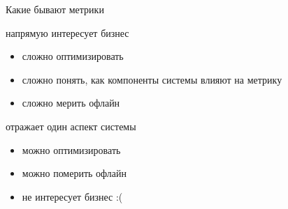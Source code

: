 \documentclass[11pt,aspectratio=169,handout]{beamer}
\begin{document}
\begin{frame}{Какие бывают метрики}

\begin{tcolorbox}[colback=gray!5,colframe=gray!80,title=Бизнесовая]
напрямую интересует бизнес
\begin{itemize}
  \item сложно оптимизировать
  \item сложно понять, как компоненты системы влияют на метрику
  \item сложно мерить офлайн
 \end{itemize}
\end{tcolorbox}

\vfill

\begin{tcolorbox}[colback=gray!5,colframe=gray!80,title=Техническая]
отражает один аспект системы
\begin{itemize}
  \item можно оптимизировать
  \item можно померить офлайн
  \item не интересует бизнес :(
 \end{itemize}
\end{tcolorbox}

\end{frame}
\end{document}

